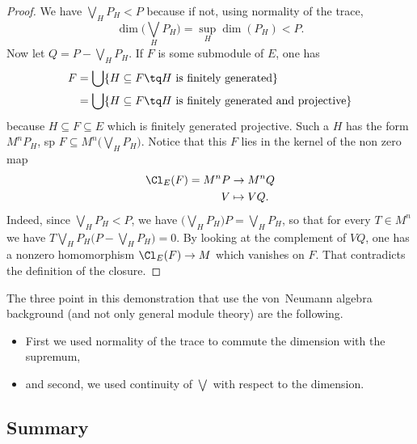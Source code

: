 \begin{proof}
We have $\bigvee_HP_H<P$ because if not, using normality of the trace,
\begin{equation}
	\dim\big( \bigvee_HP_H \big)=\sup_H\dim(P_H)<P.
\end{equation}
Now let $Q=P-\bigvee_HP_H$. If $F$ is some submodule of $E$, one has
\begin{equation}
\begin{split}
    F&=\bigcup\{ H\subseteq F\tq H\text{ is finitely generated} \}\\
    &=\bigcup\{ H\subseteq F\tq H\text{ is finitely generated and projective} \}\\
\end{split}
\end{equation}
because $H\subseteq F\subseteq E$ which is finitely generated projective. Such a $H$ has the form $M^nP_H$, sp $F\subseteq M^n\big( \bigvee_HP_H \big)$. Notice that this $F$ lies in the kernel of the non zero map
\begin{equation}
\begin{aligned}
 \Cl_E(F)=M^nP&\to M^nQ \\ 
   V&\mapsto VQ. 
\end{aligned}
\end{equation}
Indeed, since $\bigvee_HP_H<P$, we have $\big( \bigvee_HP_H \big)P=\bigvee_HP_H$, so that for every $T\in M^n$ we have $T\bigvee_HP_H\big( P-\bigvee_HP_H \big)=0$. By looking at the complement of $VQ$, one has a nonzero homomorphism $ \Cl_E(F)\to M$ which vanishes on $F$. That contradicts the definition of the closure.

\end{proof}

The three point in this demonstration that use the von~Neumann algebra background (and not only general module theory) are the following.
\begin{itemize}
\item First we used normality of the trace to commute the dimension with the supremum,
\item and second, we used continuity of $\bigvee$ with respect to the dimension.
\end{itemize}

					\subsection{Summary}

